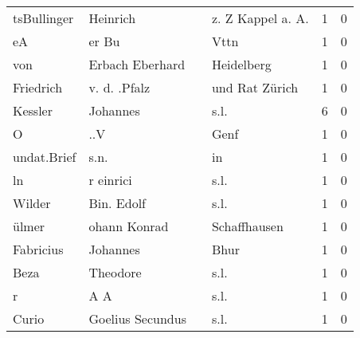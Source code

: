 \documentclass[10pt,a4paper,landscape]{article}
\begin{document}
\begin{longtable}{llllrr}
              tsBullinger &                           Heinrich &             &                          z. Z Kappel a. A.  &          1 &         0 \\
                       eA &                              er Bu &             &                                        Vttn &          1 &         0 \\
                      von &                    Erbach Eberhard &             &                                  Heidelberg &          1 &         0 \\
                Friedrich &                       v. d. .Pfalz &             &                              und Rat Zürich &          1 &         0 \\
                  Kessler &                           Johannes &             &                                        s.l. &          6 &         0 \\
                        O &                                ..V &             &                                        Genf &          1 &         0 \\
              undat.Brief &                               s.n. &             &                                          in &          1 &         0 \\
                       ln &                          r einrici &             &                                        s.l. &          1 &         0 \\
                   Wilder &                         Bin. Edolf &             &                                        s.l. &          1 &         0 \\
                    ülmer &                       ohann Konrad &             &                                Schaffhausen &          1 &         0 \\
                Fabricius &                           Johannes &             &                                        Bhur &          1 &         0 \\
                     Beza &                           Theodore &             &                                        s.l. &          1 &         0 \\
                        r &                                A A &             &                                        s.l. &          1 &         0 \\
                    Curio &                   Goelius Secundus &             &                                        s.l. &          1 &         0 \\

\end{longtable}
\end{document}
